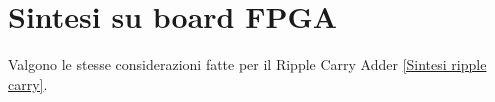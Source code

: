 %

\section{Sintesi su board FPGA}

Valgono le stesse considerazioni fatte per il Ripple Carry Adder \ref{Sintesi ripple carry}.%


